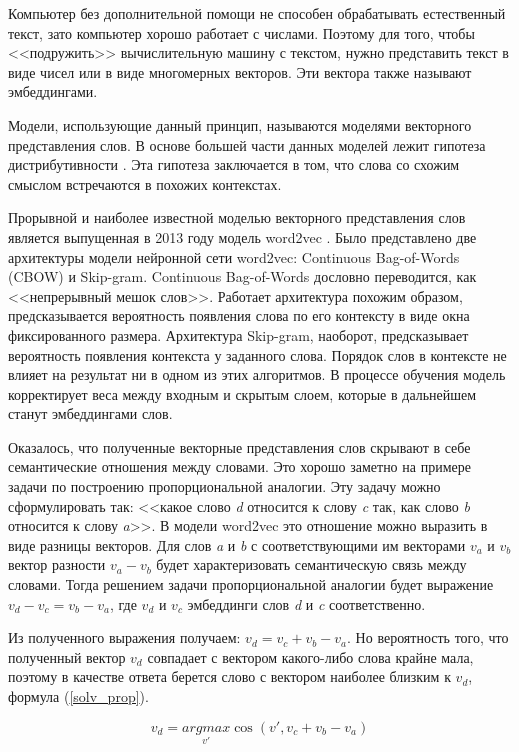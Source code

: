 \documentclass[a4paper,14pt]{article}
\begin{document}
Компьютер без дополнительной помощи не способен обрабатывать естественный текст, зато компьютер хорошо работает с числами.
Поэтому для того, чтобы <<подружить>> вычислительную машину с текстом, нужно представить текст в виде чисел или в виде многомерных векторов.
Эти вектора также называют эмбеддингами.

Модели, использующие данный принцип, называются моделями векторного представления слов.
В основе большей части данных моделей лежит гипотеза дистрибутивности \cite{distrib}.
Эта гипотеза заключается в том, что слова со схожим смыслом встречаются в похожих контекстах.

Прорывной и наиболее известной моделью векторного представления слов является выпущенная в 2013 году модель word2vec \cite{w2v}.
Было представлено две архитектуры модели нейронной сети word2vec: Continuous Bag-of-Words
(CBOW) и Skip-gram. 
Continuous Bag-of-Words дословно переводится, как <<непрерывный мешок слов>>.
Работает архитектура похожим образом, предсказывается вероятность появления слова по его контексту в виде окна фиксированного размера.
Архитектура Skip-gram, наоборот, предсказывает вероятность появления контекста у заданного слова.
Порядок слов в контексте не влияет на результат ни в одном из этих алгоритмов.
В процессе обучения модель корректирует веса между входным и скрытым слоем, которые в дальнейшем станут эмбеддингами слов.

Оказалось, что полученные векторные представления слов скрывают в себе семантические отношения между словами.
Это хорошо заметно на примере задачи по построению пропорциональной аналогии.
Эту задачу можно сформулировать так: <<какое слово \textit{d} относится к слову \textit{c} так, как слово \textit{b} относится к слову \textit{a}>>.
В модели word2vec это отношение можно выразить в виде разницы векторов.
Для слов \textit{a} и \textit{b} с соответствующими им векторами $v_a$ и $v_b$ вектор разности $v_a - v_b$ будет характеризовать семантическую связь между словами.
Тогда решением задачи пропорциональной аналогии будет выражение $v_d - v_c = v_b - v_a$, где $v_d$ и $v_c$ эмбеддинги слов \textit{d} и \textit{c} соответственно.

Из полученного выражения получаем: $v_d = v_c + v_b - v_a$.
Но вероятность того, что полученный вектор $v_d$ совпадает с вектором какого-либо слова крайне мала, поэтому в качестве ответа берется слово с вектором наиболее близким к $v_d$, формула (\ref{solv_prop}).

\begin{equation}
	v_d = \underset{v'}{argmax} \cos (v', v_c + v_b - v_a)
	\label{solv_prop}
\end{equation}
\end{document}
